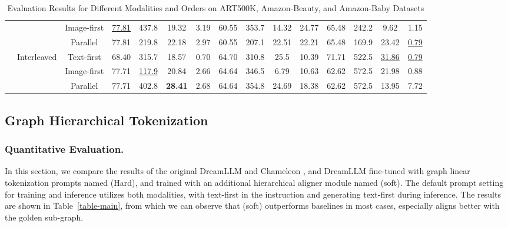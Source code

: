 \begin{table*}[h!]
{\begin{tabular}{c|c|c|cccc|cccc|cccc}
 &  & Image-first & \underline{77.81} & 437.8 & 19.32 & 3.19 & 60.55 & 353.7 & 14.32 & 24.77 & 65.48 & 242.2 & 9.62 & 1.15 \\
 &  & Parallel & 77.81 & 219.8 & 22.18 & 2.97 & 60.55 & 207.1 & 22.51 & 22.21 & 65.48 & 169.9 & 23.42 & \underline{0.79} \\ 
\cmidrule{2-15}
 & \multirow{3}{*}{Interleaved} & Text-first & 68.40 & 315.7 & 18.57 & 0.70 & 64.70 & 310.8 & 25.5 & 10.39 & 71.71 & 522.5 & \underline{31.86} & \underline{0.79} \\
 &  & Image-first & 77.71 & \underline{117.9} & 20.84 & 2.66 & 64.64 & 346.5 & 6.79 & 10.63 & 62.62 & 572.5 & 21.98 & 0.88 \\
 &  & Parallel & 77.71 & 402.8 & \textbf{28.41} & 2.68 & 64.64 & 354.8 & 24.69 & 18.38 & 62.62 & 572.5 & 13.95 & 7.72 \\ 
\bottomrule
\end{tabular}}
\caption{Evaluation Results for Different Modalities and Orders on ART500K, Amazon-Beauty, and Amazon-Baby Datasets}
\label{table-prompt}
\end{table*}






\subsection{Graph Hierarchical Tokenization}
\label{sec:res-Hiera}
\subsubsection{Quantitative Evaluation.}
In this section, we compare the results of the original DreamLLM \cite{dong2024dreamllmsynergisticmultimodalcomprehension} and Chameleon \cite{team2024chameleon}, and DreamLLM fine-tuned with graph linear tokenization prompts named \Ours (Hard), and trained with an additional hierarchical aligner module named \Ours (soft). The default prompt setting for training and inference utilizes both modalities, with text-first in the instruction and generating text-first during inference. The results are shown in Table~\ref{table-main}, from which we can observe that \Ours(soft) outperforms baselines in most cases, especially aligns better with the golden sub-graph.


